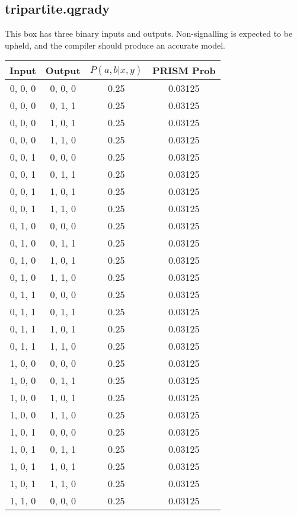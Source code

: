 \documentclass[report.tex]{subfiles}
\begin{document}
\subsection{tripartite.qgrady} %
\label{sub:threeinputs_qgrady}
This box has three binary inputs and outputs. Non-signalling is expected to
be upheld, and the compiler should produce an accurate model.
\begin{table}[H]
  \centering
  \begin{tabular}{c | c | c | c}
    Input & Output & \(P(a, b | x, y)\) & PRISM Prob \\
    \hline
    0, 0, 0 & 0, 0, 0 & 0.25 & 0.03125 \\
    0, 0, 0 & 0, 1, 1 & 0.25 & 0.03125 \\
    0, 0, 0 & 1, 0, 1 & 0.25 & 0.03125 \\
    0, 0, 0 & 1, 1, 0 & 0.25 & 0.03125 \\
    0, 0, 1 & 0, 0, 0 & 0.25 & 0.03125 \\
    0, 0, 1 & 0, 1, 1 & 0.25 & 0.03125 \\
    0, 0, 1 & 1, 0, 1 & 0.25 & 0.03125 \\
    0, 0, 1 & 1, 1, 0 & 0.25 & 0.03125 \\
    0, 1, 0 & 0, 0, 0 & 0.25 & 0.03125 \\
    0, 1, 0 & 0, 1, 1 & 0.25 & 0.03125 \\
    0, 1, 0 & 1, 0, 1 & 0.25 & 0.03125 \\
    0, 1, 0 & 1, 1, 0 & 0.25 & 0.03125 \\
    0, 1, 1 & 0, 0, 0 & 0.25 & 0.03125 \\
    0, 1, 1 & 0, 1, 1 & 0.25 & 0.03125 \\
    0, 1, 1 & 1, 0, 1 & 0.25 & 0.03125 \\
    0, 1, 1 & 1, 1, 0 & 0.25 & 0.03125 \\
    1, 0, 0 & 0, 0, 0 & 0.25 & 0.03125 \\
    1, 0, 0 & 0, 1, 1 & 0.25 & 0.03125 \\
    1, 0, 0 & 1, 0, 1 & 0.25 & 0.03125 \\
    1, 0, 0 & 1, 1, 0 & 0.25 & 0.03125 \\
    1, 0, 1 & 0, 0, 0 & 0.25 & 0.03125 \\
    1, 0, 1 & 0, 1, 1 & 0.25 & 0.03125 \\
    1, 0, 1 & 1, 0, 1 & 0.25 & 0.03125 \\
    1, 0, 1 & 1, 1, 0 & 0.25 & 0.03125 \\
    1, 1, 0 & 0, 0, 0 & 0.25 & 0.03125 \\

\end{tabular}
\end{table}
\end{document}
